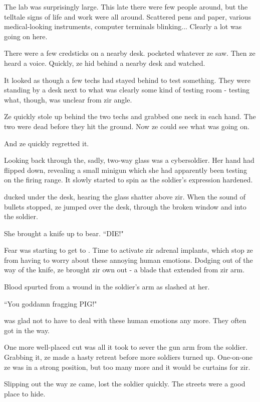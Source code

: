 The lab was surprisingly large. This late there were few people around, but the telltale signs of life and work were all around. Scattered pens and paper, various medical-looking instruments, computer terminals blinking... Clearly a lot was going on here.

There were a few credsticks on a nearby desk. \protagonist{} pocketed whatever ze saw. Then ze heard a voice. Quickly, ze hid behind a nearby desk and watched.

It looked as though a few techs had stayed behind to test something. They were standing by a desk next to what was clearly some kind of testing room - testing what, though, was unclear from zir angle.

Ze quickly stole up behind the two techs and grabbed one neck in each hand. The two were dead before they hit the ground. Now ze could see what was going on.

And ze quickly regretted it.

Looking back through the, sadly, two-way glass was a cybersoldier. Her hand had flipped down, revealing a small minigun which she had apparently been testing on the firing range. It slowly started to spin as the soldier's expression hardened.

\protagonist{} ducked under the desk, hearing the glass shatter above zir. When the sound of bullets stopped, ze jumped over the desk, through the broken window and into the soldier.

She brought a knife up to bear. ``DIE!"

Fear was starting to get to \protagonist{}. Time to activate zir adrenal implants, which stop ze from having to worry about these annoying human emotions. Dodging out of the way of the knife, ze brought zir own out - a blade that extended from zir arm.

Blood spurted from a wound in the soldier's arm as \protagonist{} slashed at her.

``You goddamn fragging PIG!"

\protagonist{} was glad not to have to deal with these human emotions any more. They often got in the way.

One more well-placed cut was all it took to sever the gun arm from the soldier. Grabbing it, ze made a hasty retreat before more soldiers turned up. One-on-one ze was in a strong position, but too many more and it would be curtains for zir.

Slipping out the way ze came, \protagonist{} lost the soldier quickly. The streets were a good place to hide.

